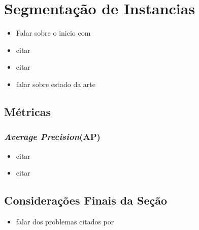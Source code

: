 \newpage
\section{Segmentação de Instancias}
\begin{itemize}
    \item Falar sobre o inicio com \cite{Vaillant1994}
    \item citar \cite{Minaee2021}
    \item citar \cite{Bolya2019}
    \item falar sobre estado da arte \cite{Hafiz2020}
\end{itemize}

\subsection{Métricas}
\subsubsection{\textit{Average Precision}(AP)}
\label{instance:AP}
\begin{itemize}
    \item citar \cite{Hariharan2014}
    \item citar \cite{Lin2014}
\end{itemize}


\subsection{Considerações Finais da Seção}
\begin{itemize}
    \item falar dos problemas citados por \cite{Kirillov2019a}
\end{itemize}
